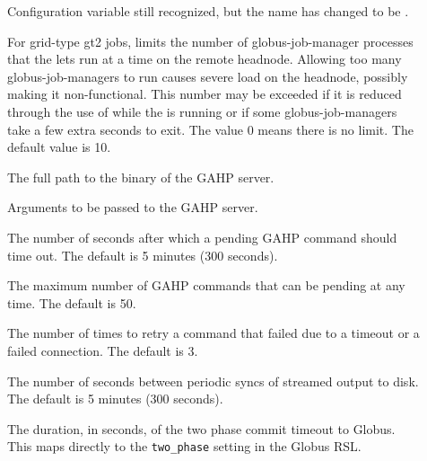 \begin{description}
\item[]
\label{param:GridmanagerMaxPendingSubmits} Configuration variable
still recognized, but the name has changed to be
.

\item[]
\label{param:GridmanagerMaxJobmanagersPerResource}
For grid-type gt2 jobs, limits the number of globus-job-manager
processes that the  lets run at a time on
the remote headnode. Allowing too many globus-job-managers to run
causes severe load on the headnode, possibly making it
non-functional.
This number may be exceeded if it is reduced through the use
of  while the  is running
or if some globus-job-managers take a few extra seconds to exit.
The value 0 means there is no limit. The default value is 10.

\item[]
\label{param:Gahp} The full path to the binary of the GAHP server.

\item[]
\label{param:GahpArgs} Arguments to be passed to the GAHP server.

\item[]
\label{param:GridmanagerGahpCallTimeout} The number of seconds after
which a pending GAHP command should time out. The default is 5 minutes
(300 seconds).

\item[]
\label{param:GridmanagerMaxPendingRequests} The maximum number of GAHP
commands that can be pending at any time. The default is 50.

\item[]
\label{param:GridmanagerConnectFailureRetryCount} The number of times
to retry a command that failed due to a timeout or a failed connection.
The default is 3.

\item[]
\label{param:GridmanagerSyncJobIoInterval} The number of seconds between
periodic syncs of streamed output to disk. The default is 5 minutes
(300 seconds).

\item[]
\label{param:GridmanagerGlobusCommitTimeout}  The duration, in seconds, of the
two phase commit timeout to Globus.  This maps directly to the \texttt{two\_phase} setting in the Globus RSL.


\end{description}
